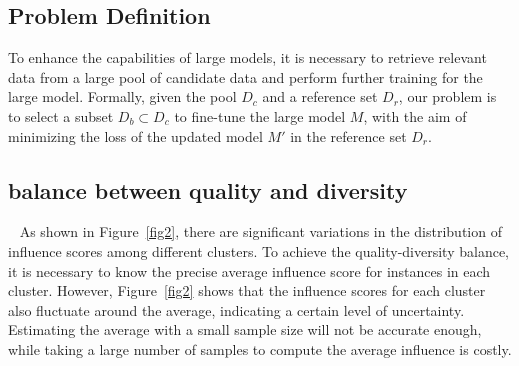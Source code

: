 \documentclass{article} %
\begin{document}



\subsection{Problem Definition}
\label{sec:framwork}
To enhance the capabilities of large models, it is necessary to retrieve relevant data from a large pool of candidate data and perform further training for the large model. 
%
Formally, given the pool $D_c$ and a reference set $D_r$, our problem is to select a subset  $D_b \subset D_c$  to fine-tune the large model $M$, with the aim of minimizing the loss of the updated model $M'$ in the reference set $D_r$. 




\subsection{balance between quality and diversity}~\label{sec:mab}
As shown in Figure~\ref{fig2}, there are significant variations in the distribution of influence scores among different clusters.
To achieve the quality-diversity balance, it is necessary to know the precise average influence score for instances in each cluster.
However, Figure~\ref{fig2} shows that the influence scores for each cluster also fluctuate around the average, indicating a certain level of uncertainty. Estimating the average with a small sample size will not be accurate enough, while taking a large number of samples to compute the average influence is costly.
%
\end{document}
